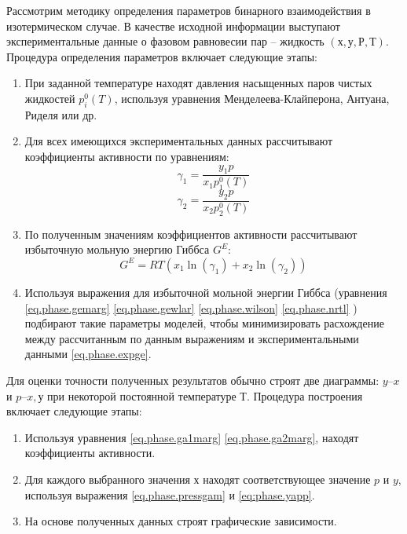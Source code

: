 Рассмотрим методику определения параметров бинарного взаимодействия в изотермическом случае. В качестве исходной информации выступают экспериментальные данные о фазовом равновесии пар – жидкость $(х, у, Р, Т)$. Процедура определения параметров включает следующие этапы:
\begin{enumerate}
	\item При заданной температуре находят давления насыщенных паров чистых жидкостей $p_i^0(T)$, используя уравнения Менделеева-Клайперона, Антуана, Риделя или др.
	\item Для всех имеющихся экспериментальных данных рассчитывают коэффициенты активности по уравнениям:
	\begin{equation}
		\gamma_1=\dfrac{y_1 p}{x_1 p_1^0(T)}
	\end{equation}
	\begin{equation}
		\gamma_2=\dfrac{y_2 p}{x_2 p_2^0(T)}
	\end{equation}
	\item По полученным значениям коэффициентов активности рассчитывают избыточную мольную энергию Гиббса $G^E$:
	\begin{equation}\label{eq.phase.expge}
		G^E=RT(x_1 \ln(\gamma_1)+x_2 \ln(\gamma_2))
	\end{equation}
	\item Используя  выражения для избыточной мольной энергии Гиббса (уравнения \eqref{eq.phase.gemarg} \eqref{eq.phase.gewlar} \eqref{eq.phase.wilson} \eqref{eq.phase.nrtl} ) подбирают такие параметры моделей, чтобы минимизировать расхождение между рассчитанным по данным выражениям и экспериментальными данными \eqref{eq.phase.expge}.
\end{enumerate}

Для оценки точности полученных результатов обычно строят две диаграммы: $y – x$ и $p – x, у$ при некоторой постоянной температуре $Т$. Процедура построения включает следующие этапы:
\begin{enumerate}
\item Используя уравнения \eqref{eq.phase.ga1marg} \eqref{eq.phase.ga2marg}, находят коэффициенты активности.
\item Для каждого выбранного значения х находят соответствующее значение $p$ и $y$, используя выражения \eqref{eq.phase.pressgam} и \eqref{eq:phase.yapp}.
\item На основе полученных данных строят графические зависимости.
\end{enumerate}


